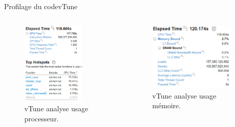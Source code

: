 \documentclass{beamer}
\begin{document}
\begin{frame}{Profilage du code}{vTune}
\begin{columns}
    \column{6.5cm}
    \begin{figure}
      \centering
   \includegraphics[width=0.75\textwidth]{vtune.png}
   \caption{vTune analyse usage processeur.\label{Fig:vTune_proc}}
    \end{figure}
    \column{6.5cm}
    \begin{figure}
      \centering
   \includegraphics[width=0.9\textwidth]{memory_vtune.png}
   \caption{vTune analyse usage mémoire.\label{Fig:vTune_mem}}
    \end{figure}
    
  \end{columns}
\end{frame}
\end{document}
